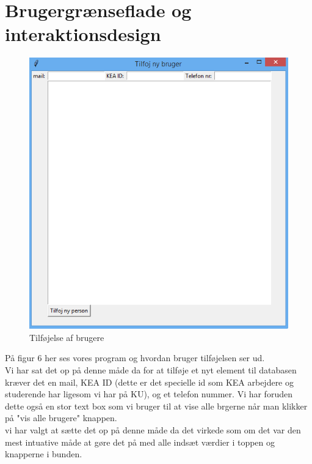 \documentclass[a4paper]{article}
\begin{document}
\section{Brugergrænseflade og interaktionsdesign}
\begin{figure}[h!]
\centering
\includegraphics[width=1\textwidth]{Tilfojbruger.png}
\caption{Tilføjelse af brugere}
\end{figure}
På figur 6 her ses vores program og hvordan bruger tilføjelsen ser ud.\\
Vi har sat det op på denne måde da for at tilføje et nyt element til databasen kræver det en mail, KEA ID (dette er det specielle id som KEA arbejdere og studerende har ligesom vi har på KU), og et telefon nummer. Vi har foruden dette også en stor text box som vi bruger til at vise alle brgerne når man klikker på "vis alle brugere" knappen.\\
vi har valgt at sætte det op på denne måde da det virkede som om det var den mest intuative måde at gøre det på med alle indsæt værdier i toppen og knapperne i bunden.\\
\pagebreak
\end{document}
